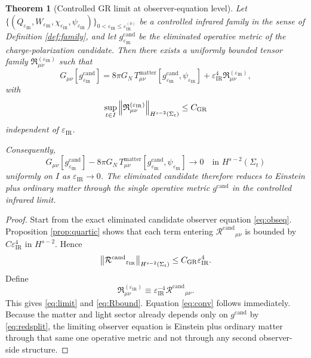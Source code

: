 \documentclass[11pt]{article}
\newcommand{\CandidateMetric}{g^{\mathrm{cand}}}
\newcommand{\RemCand}{\mathcal R^{\mathrm{cand}}}
\newcommand{\IRsmall}{\varepsilon_{\mathrm{IR}}}
\newtheorem{theorem}{Theorem}
\begin{document}
\begin{theorem}[Controlled GR limit at observer-equation level]
\label{thm:phaseF}
Let \(\{(Q_{\IRsmall},W_{\IRsmall},\chi_{\IRsmall},\psi_{\IRsmall})\}_{0<\IRsmall\le\IRsmall^{(0)}}\) be a controlled infrared family in the sense of Definition \ref{def:family}, and let \(\CandidateMetric_{\IRsmall}\) be the eliminated operative metric of the charge-polarization candidate. Then there exists a uniformly bounded tensor family \(\mathfrak R_{\mu\nu}^{(\IRsmall)}\) such that
\begin{equation}
G_{\mu\nu}[\CandidateMetric_{\IRsmall}]
=
8\pi G_N\,
T_{\mu\nu}^{\mathrm{matter}}[\CandidateMetric_{\IRsmall},\psi_{\IRsmall}]
+
\IRsmall^4\mathfrak R_{\mu\nu}^{(\IRsmall)},
\label{eq:limit}
\end{equation}
with
\begin{equation}
\sup_{t\in I}
\norm{\mathfrak R_{\mu\nu}^{(\IRsmall)}}_{H^{s-2}(\Sigma_t)}
\le
C_{\mathrm{GR}}
\label{eq:Rbound}
\end{equation}
independent of \(\IRsmall\).

Consequently,
\begin{equation}
G_{\mu\nu}[\CandidateMetric_{\IRsmall}]
-
8\pi G_N\,
T_{\mu\nu}^{\mathrm{matter}}[\CandidateMetric_{\IRsmall},\psi_{\IRsmall}]
\longrightarrow 0
\quad\text{in }H^{s-2}(\Sigma_t)
\label{eq:conv}
\end{equation}
uniformly on \(I\) as \(\IRsmall\to0\). The eliminated candidate therefore reduces to Einstein plus ordinary matter through the single operative metric \(\CandidateMetric\) in the controlled infrared limit.
\end{theorem}

\begin{proof}
Start from the exact eliminated candidate observer equation \eqref{eq:obseq}. Proposition \ref{prop:quartic} shows that each term entering \(\RemCand{}_{\mu\nu}\) is bounded by \(C\IRsmall^4\) in \(H^{s-2}\). Hence
\[
\norm{\RemCand{}_{\IRsmall}}_{H^{s-2}(\Sigma_t)}
\le
C_{\mathrm{GR}}\IRsmall^4.
\]
Define
\[
\mathfrak R_{\mu\nu}^{(\IRsmall)}
\equiv
\IRsmall^{-4}\RemCand{}_{\mu\nu}.
\]
This gives \eqref{eq:limit} and \eqref{eq:Rbound}. Equation \eqref{eq:conv} follows immediately. Because the matter and light sector already depends only on \(\CandidateMetric\) by \eqref{eq:redsplit}, the limiting observer equation is Einstein plus ordinary matter through that same one operative metric and not through any second observer-side structure.
\end{proof}
\end{document}
